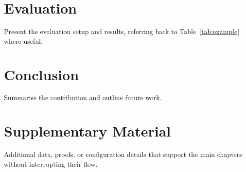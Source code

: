 \documentclass[a4paper,11pt]{report}
\begin{document}
\chapter{Evaluation}
\label{ch:evaluation}
Present the evaluation setup and results, referring back to
Table~\ref{tab:example} where useful.

\chapter{Conclusion}
\label{ch:conclusion}
Summarise the contribution and outline future work.

\appendix
\chapter{Supplementary Material}
Additional data, proofs, or configuration details that support the
main chapters without interrupting their flow.
\end{document}
